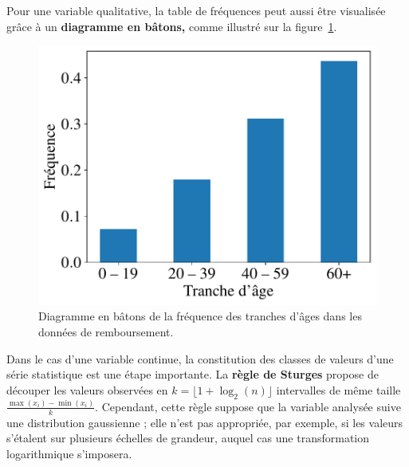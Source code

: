 Pour une variable qualitative, la table de fréquences peut aussi être
visualisée grâce à un \textbf{diagramme en bâtons,} comme illustré sur la
figure~\ref{fig:remboursement_age_bars}.
\begin{figure}[h]
	\centering
	\includegraphics[width=.5\textwidth]{figures/stats/remboursement_age_bars}
	\caption{Diagramme en bâtons de la fréquence des tranches d'âges dans les
		données de remboursement.}
	\label{fig:remboursement_age_bars}
\end{figure}

Dans le cas d'une variable continue, la constitution des classes de valeurs
d'une série statistique est une étape importante. La \textbf{règle de Sturges}
propose de découper les valeurs observées en $k = \lfloor 1 + \log_2(n)\rfloor$
intervalles de même taille $\frac{\max(x_i) - \min(x_i)}{k}$. Cependant, cette
règle suppose que la variable analysée suive une distribution gaussienne ; elle
n'est pas appropriée, par exemple, si les valeurs s'étalent sur plusieurs
échelles de grandeur, auquel cas une transformation logarithmique s'imposera.



